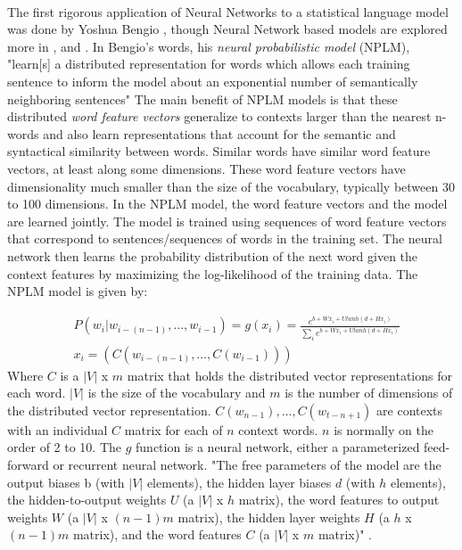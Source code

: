 \paragraph{}
The first rigorous application of Neural Networks to a statistical language model was done by Yoshua Bengio \cite{Bengio2003}, though Neural Network based models are explored more in \cite{Collobert2008}, and \cite{HuangEtAl2012} . In Bengio's words, his \emph{neural probabilistic model} (NPLM), "learn[s] a distributed representation for words which allows each training sentence to inform the model about an exponential number of semantically neighboring sentences" \cite[pg. 1137]{Bengio2003} The main benefit of NPLM models is that these distributed \emph{word feature vectors} generalize to contexts larger than the nearest n-words and also learn representations that account for the semantic and syntactical similarity between words. Similar words have similar word feature vectors, at least along some dimensions. These word feature vectors have dimensionality much smaller than the size of the vocabulary, typically between 30 to 100 dimensions. In the NPLM model, the word feature vectors and the model are learned jointly. The model is trained using sequences of word feature vectors that correspond to sentences/sequences of words in the training set. The neural network then learns the probability distribution of the next word given the context features by maximizing the log-likelihood of the training data. 
The NPLM model is given by:

\begin{align}
&P(w_i | w_{i-(n-1)},\dots, w_{i-1}) = g(x_i) = \frac {e^{b+Wx_i+Utanh(d+Hx_i)}} {\sum_i e^{b+Wx_i+Utanh(d+Hx_i)}} \label{FFNN}
\\
&x_i=\left(C(w_{i-(n-1)}, \dots, C(w_{i-1}) )\right) \nonumber
\end{align}
Where $C$ is a $|V|$ x $m$ matrix that holds the distributed vector representations for each word.  $|V|$ is the size of the vocabulary and $m$ is the number of dimensions of the distributed vector representation. $C(w_{n-1}), \dots, C(w_{t-n+1})$ are contexts with an individual $C$ matrix for each of $n$ context words. $n$ is normally on the order of 2 to 10. The $g$ function is a neural network, either a parameterized feed-forward or recurrent neural network. 
"The free parameters of the model are the output biases b (with $|V|$ elements), the hidden layer biases $d$ (with $h$ elements), the hidden-to-output weights $U$ (a $|V|$ x $h$ matrix), the word features to output weights $W$ (a $|V|$ x $(n-1)m$ matrix), the hidden layer weights $H$ (a $h$ x $(n-1)m$ matrix), and the word features $C$ (a $|V|$ x $m$ matrix)" \cite[pg. 1143]{Bengio2003}.
